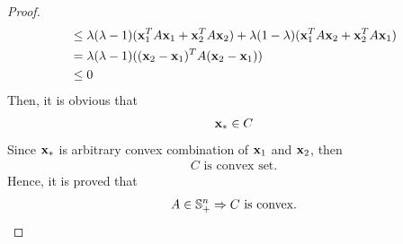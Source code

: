 \documentclass[11pt,a4paper]{article}
\begin{document}
\begin{proof}
\begin{align}
        & \leq \lambda (\lambda - 1) (\mathbf{x}_{1}^{T} A \mathbf{x}_{1} + \mathbf{x}_{2}^{T} A \mathbf{x}_{2}) 
        + \lambda(1-\lambda) (\mathbf{x}_{1}^{T} A \mathbf{x}_{2} + \mathbf{x}_{2}^{T} A \mathbf{x}_{1}) \\
        & = \lambda(\lambda - 1) ((\mathbf{x}_{2} - \mathbf{x}_{1})^{T} A (\mathbf{x}_{2} - \mathbf{x}_{1})) \\
        & \leq 0
    \end{align}
    Then, it is obvious that 
    \begin{align}
        \mathbf{x}_{*} \in C
    \end{align}
    Since $\mathbf{x}_{*}$ is arbitrary convex combination of $\mathbf{x}_{1}$ and $\mathbf{x}_{2}$, then
    \begin{align}
        \text{$C$ is convex set.}
    \end{align}
    Hence, it is proved that 
    \begin{align}
        A \in \mathbb{S}_{+}^{n} \Rightarrow \text{$C$ is convex.}
    \end{align}
\end{proof}

\newpage
\newcommand{\Rn}{\mathbb{R}^{n}}
\newcommand{\glinear}[1]{\ensuremath{g^T #1}}
\newcommand{\Apgg} {\ensuremath{A + \lambda gg^T}}
\newcommand{\lambdaopt} {\ensuremath{\lambda^{*}}}
\newcommand{\Apggquadratic}[1]{\ensuremath{#1^{T} (A + \lambdaopt gg^T) #1}}
\newcommand{\ggquadratic}[1]{\ensuremath{#1^{T} (\lambdaopt gg^T) #1}}
\end{document}
